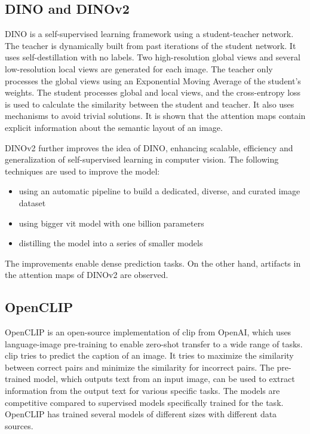 \documentclass[conference]{IEEEtran}
\begin{document}
  \subsection{\mbox{DINO} and \mbox{DINOv2}}
  \label{sec:dino-dinov2}

  \mbox{DINO} is a self-supervised learning framework using a student-teacher network. The teacher is dynamically built from past iterations of the student network. It uses self-destillation with no labels. Two high-resolution global views and several low-resolution local views are generated for each image. The teacher only processes the global views using an Exponential Moving Average of the student's weights. The student processes global and local views, and the cross-entropy loss is used to calculate the similarity between the student and teacher. It also uses mechanisms to avoid trivial solutions. \cite{dino} It is shown that the attention maps contain explicit information about the semantic layout of an image. \cite{registers}

  \mbox{DINOv2} further improves the idea of \mbox{DINO}, enhancing scalable, efficiency and generalization of self-supervised learning in computer vision. The following techniques are used to improve the model:
  \begin{itemize}
   \item using an automatic pipeline to build a dedicated, diverse, and curated      image dataset
   \item using bigger \ac{vit} model with one billion parameters
   \item distilling the model into a series of smaller models \cite{dinov2}
  \end{itemize}
  The improvements enable dense prediction tasks. On the other hand, artifacts in the attention maps of \mbox{DINOv2} are observed. \cite{registers}
  
  \subsection{OpenCLIP}
  \label{sec:openclip}
  
  \mbox{OpenCLIP} is an open-source implementation of \ac{clip} \cite{clip} from OpenAI, which uses language-image pre-training to enable zero-shot transfer to a wide range of tasks. \ac{clip} tries to predict the caption of an image. It tries to maximize the similarity between correct pairs and minimize the similarity for incorrect pairs. The pre-trained model, which outputs text from an input image, can be used to extract information from the output text for various specific tasks. The models are competitive compared to supervised models specifically trained for the task. \cite{clip}
  \mbox{OpenCLIP} has trained several models of different sizes with different data sources. \cite{open-clip} 
\end{document}

